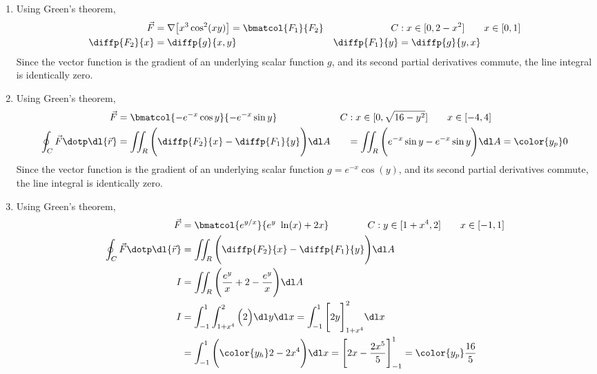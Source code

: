 \begin{enumerate}
    \item Using Green's theorem,
          \begin{align}
              \vec{F}              & = \nabla \big[x^3 \cos^2(xy)\big]
              = \bmatcol{F_1}{F_2} &
              C                    & : x \in [0 , 2 - x^2] \qquad x \in [0, 1]   \\
              \diffp {F_2}{x}      & = \diffp{g}{x, y}                         &
              \diffp {F_1}{y}      & = \diffp{g}{y, x}
          \end{align}
          Since the vector function is the gradient of an underlying scalar function
          $ g $, and its second partial derivatives commute, the line integral is
          identically zero.

    \item Using Green's theorem,
          \begin{align}
              \vec{F}      & = \bmatcol{-e^{-x}\cos y}{-e^{-x} \sin y}            &
              C            & : x \in [0, \sqrt{16 - y^2}] \qquad x \in [-4, 4]      \\
              \oint_C \vec{F} \dotp \dl{\vec{r}}
                           & = \iint_R \Bigg( \diffp {F_2}{x} - \diffp{F_1}{y}
              \Bigg) \dl A &
                           & = \iint_R \Bigg( e^{-x} \sin y - e^{-x}\sin y \Bigg)
              \dl A
              = \color{y_p} 0
          \end{align}
          Since the vector function is the gradient of an underlying scalar function
          $ g = e^{-x}\cos(y)$, and its second partial derivatives commute, the line
          integral is identically zero.

    \item Using Green's theorem,
          \begin{align}
              \vec{F} & = \bmatcol{e^{y/x}}{e^{y}\ \ln(x) + 2x} \qquad \qquad
              C : y \in [1 + x^4, 2] \qquad x \in [-1, 1]                            \\
              \oint_C \vec{F} \dotp \dl{\vec{r}}
                      & = \iint_R \Bigg( \diffp {F_2}{x} - \diffp{F_1}{y}
              \Bigg) \dl A                                                           \\
              I       & = \iint_R \Bigg( \frac{e^y}{x} + 2 - \frac{e^y}{x} \Bigg)
              \dl A                                                                  \\
              I       & = \int_{-1}^{1} \int_{1 + x^4}^{2} \Big( 2 \Big) \dl y \dl x
              =  \int_{-1}^{1} \Bigg[ 2y \Bigg]_{1 + x^4}^{2} \dl x                  \\
                      & = \int_{-1}^{1} \Bigg({\color{y_h} 2 - 2x^4} \Bigg)
              \dl x
              = \Bigg[ 2x - \frac{2x^5}{5} \Bigg]_{-1}^{1}
              = \color{y_p} \frac{16}{5}
          \end{align}


\end{enumerate}
